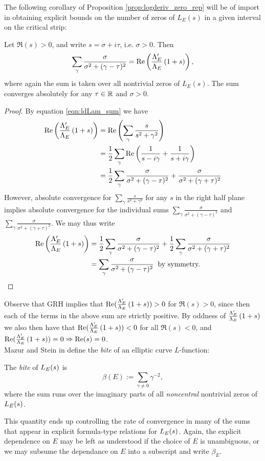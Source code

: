 The following corollary of Proposition \ref{prop:logderiv_zero_rep} will be of import in obtaining explicit bounds on the number of zeros of $L_E(s)$ in a given interval on the critical strip:
\begin{corollary}\label{cor:Re_logderiv}
Let $\Re(s) > 0$, and write $s = \sigma + i\tau$, i.e. $\sigma > 0$. Then
\begin{equation}
\sum_{\gamma} \frac{\sigma}{\sigma^2+(\gamma-\tau)^2} = \mbox{\rm Re}\left(\frac{\Lambda_E^{\prime}}{\Lambda_E}\left(1+s\right)\right),
\end{equation}
where again the sum is taken over all nontrivial zeros of $L_E(s)$. The sum converges absolutely for any $\tau \in \mathbb{R}$ and $\sigma > 0$.
\end{corollary}
\begin{proof}
By equation \ref{eqn:ldLam_sum} we have
\begin{align*}
\mbox{\rm Re}\left(\frac{\Lambda_E^{\prime}}{\Lambda_E}\left(1+s\right)\right) &= \mbox{\rm Re}\left(\sum_{\gamma} \frac{s}{s^2+\gamma^2}\right) \\
& = \frac{1}{2} \sum_{\gamma} \mbox{\rm Re}\left(\frac{1}{s - i \gamma} + \frac{1}{s + i \gamma}\right) \\
&= \frac{1}{2} \sum_{\gamma} \frac{\sigma}{\sigma^2+(\gamma-\tau)^2} +  \frac{\sigma}{\sigma^2+(\gamma+\tau)^2}
\end{align*}
However, absolute convergence for $\sum_{\gamma} \frac{s}{s^2+\gamma^2}$ for any $s$ in the right half plane implies absolute convergence for the individual sums $\sum_{\gamma} \frac{\sigma}{\sigma^2+(\gamma-\tau)^2}$ and $\sum_{\gamma} \frac{\sigma}{\sigma^2+(\gamma+\tau)^2}$. We may thus write
\begin{align*}
\mbox{\rm Re}\left(\frac{\Lambda_E^{\prime}}{\Lambda_E}\left(1+s\right)\right) &= \frac{1}{2} \sum_{\gamma} \frac{\sigma}{\sigma^2+(\gamma-\tau)^2} +  \frac{1}{2} \sum_{\gamma}\frac{\sigma}{\sigma^2+(\gamma+\tau)^2} \\
&= \sum_{\gamma} \frac{\sigma}{\sigma^2+(\gamma-\tau)^2} \;\;\text{by symmetry.}
\end{align*}
\end{proof}
Observe that GRH implies that $\mbox{\rm Re}(\frac{\Lambda_E^{\prime}}{\Lambda_E}\left(1+s\right))>0$ for $\Re(s)>0$, since then each of the terms in the above sum are strictly positive. By oddness of $\frac{\Lambda_E^{\prime}}{\Lambda_E}\left(1+s\right)$ we also then have that $\mbox{\rm Re}(\frac{\Lambda_E^{\prime}}{\Lambda_E}\left(1+s\right))<0$ for all $\Re(s)<0$, and $\mbox{\rm Re}(\frac{\Lambda_E^{\prime}}{\Lambda_E}\left(1+s\right))=0 \Rightarrow \mbox{\rm Re}(s)=0$. \\

Mazur and Stein in \cite{MaSt-2013} define the {\it bite} of an elliptic curve $L$-function:
\begin{definition}\label{defn:bite}
The {\it bite} of $L_E(s)$ is
\begin{equation}
\beta(E) := \sum_{\gamma \ne 0} \gamma^{-2},
\end{equation}
where the sum runs over the imaginary parts of all {\it noncentral} nontrivial zeros of $L_E(s)$.
\end{definition}
This quantity ends up controlling the rate of convergence in many of the sums that appear in explicit formula-type relations for $L_E(s)$. Again, the explicit dependence on $E$ may be left as understood if the choice of $E$ is unambiguous, or we may subsume the dependance on $E$ into a subscript and write $\beta_E$. \\

